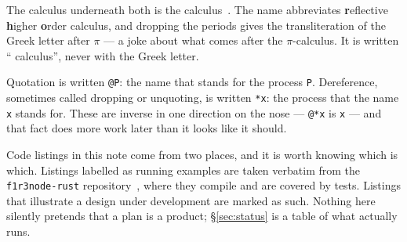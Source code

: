 The calculus underneath both is the \rhoc{} calculus~\cite{MR05}. The name abbreviates
\textbf{r}eflective \textbf{h}igher \textbf{o}rder calculus, and dropping the
periods gives the transliteration of the Greek letter after $\pi$ --- a joke
about what comes after the $\pi$-calculus. It is written ``\rhoc{} calculus'',
never with the Greek letter.

Quotation is written \texttt{@P}: the name that stands for the process
\texttt{P}. Dereference, sometimes called dropping or unquoting, is written
\texttt{*x}: the process that the name \texttt{x} stands for. These are inverse
in one direction on the nose --- \texttt{@*x} is \texttt{x} --- and that fact
does more work later than it looks like it should.

Code listings in this note come from two places, and it is worth knowing which
is which. Listings labelled as running examples are taken verbatim from the
\texttt{f1r3node-rust} repository~\cite{f1r3node,modulesyntax}, where they
compile and are covered by tests.
Listings that illustrate a design under development are marked as such. Nothing
here silently pretends that a plan is a product; \S\ref{sec:status} is a table
of what actually runs.
